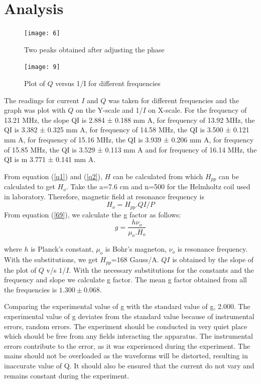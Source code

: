 \documentclass[a4paper, amsfonts, amssymb, amsmath, reprint, showkeys, nofootinbib, twoside]{revtex4-1}
\begin{document}
\section{Analysis}

\begin{figure}[htbp] %
   \centering
   \texttt{[image: 6]} 
   \caption{Two peaks obtained after adjusting the phase}
   \label{lines}
\end{figure}

\begin{figure}[htbp] %
   \centering
   \texttt{[image: 9]} 
   \caption{Plot of $Q$ versus 1/I for different frequencies}
   \label{g}
\end{figure}

The readings for current $I$ and $Q$ was taken for different frequencies and the graph was plot with $Q$ on the Y-scale and 1/$I$ on X-scale. For the frequency of 13.21 MHz, the slope QI is 2.884 ± 0.188 mm A, for frequency of 13.92 MHz, the QI is 3.382 ± 0.325 mm A, for frequency of 14.58 MHz, the QI is 3.500 ± 0.121 mm A,  for frequency of 15.16 MHz, the QI is 3.939 ± 0.206 mm A, for frequency of 15.85 MHz, the QI is 3.529 ± 0.113 mm A and for frequency of 16.14 MHz, the QI is m 3.771 ± 0.141 mm A. 
\newline

From equation (\ref{q1}) and (\ref{q2}), $H$ can be calculated from which $H_{pp}$ can be calculated to get $H_o$. Take the a=7.6 cm and n=500 for the Helmholtz coil used in laboratory. Therefore,  magnetic field at resonance frequency is 
\begin{equation}
H_o=H_{pp}.QI/P
\end{equation}
\newline
From equation (\ref{69}), we calculate the g factor as follows:
\begin{equation}
g=\frac{h\nu_o}{\mu_o.H_o}
\end{equation} 

where $h$ is Planck's constant, $\mu_{o}$ is Bohr's magneton, $\nu_o$ is resonance frequency. With the substitutions, we get $H_{pp}$=168 Gauss/A. $QI$ is obtained by the slope of the plot of $Q$ v/s $1/I$.
With the necessary substitutions for the constants and the frequency and slope we calculate g factor. The mean g factor obtained from all the frequencies is $1.300\pm0.068$. 

Comparing the experimental value of g with the standard value of g, 2.000. The experimental value of g deviates from the standard value because of instrumental errors, random errors. The experiment should be conducted in very quiet place which should be free from any fields interacting the apparatus. The instrumental errors contribute to the error, as it was experienced during the experiment. The mains should not be overloaded as the waveforms will be distorted, resulting in inaccurate value of Q. It should also be ensured that the current do not vary and remains constant during the experiment.
\end{document}
